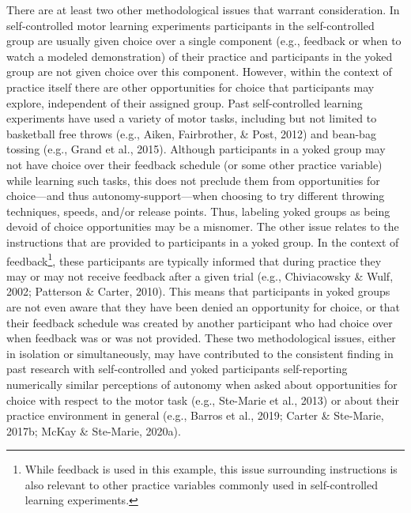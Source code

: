 \documentclass[
  english,
  doc, donotrepeattitle,floatsintext]{apa7}
\begin{document}
There are at least two other methodological issues that warrant consideration. In self-controlled motor learning experiments participants in the self-controlled group are usually given choice over a single component (e.g., feedback or when to watch a modeled demonstration) of their practice and participants in the yoked group are not given choice over this component. However, within the context of practice itself there are other opportunities for choice that participants may explore, independent of their assigned group. Past self-controlled learning experiments have used a variety of motor tasks, including but not limited to basketball free throws (e.g., Aiken, Fairbrother, \& Post, 2012) and bean-bag tossing (e.g., Grand et al., 2015). Although participants in a yoked group may not have choice over their feedback schedule (or some other practice variable) while learning such tasks, this does not preclude them from opportunities for choice---and thus autonomy-support---when choosing to try different throwing techniques, speeds, and/or release points. Thus, labeling yoked groups as being devoid of choice opportunities may be a misnomer. The other issue relates to the instructions that are provided to participants in a yoked group. In the context of feedback\footnote{While feedback is used in this example, this issue surrounding instructions is also relevant to other practice variables commonly used in self-controlled learning experiments.}, these participants are typically informed that during practice they may or may not receive feedback after a given trial (e.g., Chiviacowsky \& Wulf, 2002; Patterson \& Carter, 2010). This means that participants in yoked groups are not even aware that they have been denied an opportunity for choice, or that their feedback schedule was created by another participant who had choice over when feedback was or was not provided. These two methodological issues, either in isolation or simultaneously, may have contributed to the consistent finding in past research with self-controlled and yoked participants self-reporting numerically similar perceptions of autonomy when asked about opportunities for choice with respect to the motor task (e.g., Ste-Marie et al., 2013) or about their practice environment in general (e.g., Barros et al., 2019; Carter \& Ste-Marie, 2017b; McKay \& Ste-Marie, 2020a).
\end{document}
